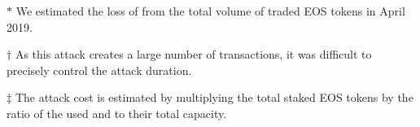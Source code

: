 \begin{table}[!t]
\begin{threeparttable}
\footnotesize
\begin{tablenotes}
\item [$\ast$] We estimated the loss of \eos from the total volume of traded EOS
    tokens in April 2019.
\item [$\dagger$] As this attack creates a large number of transactions, it was
    difficult to precisely control the attack duration.
\item [$\ddagger$] The attack cost is estimated by multiplying the total staked
    EOS tokens by the ratio of the used \cpu and \net to their total capacity.
\end{tablenotes}
\end{threeparttable}
\end{table}
